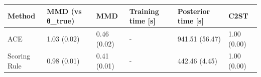 \begin{tabular}{llllll}
\toprule
Method & MMD (vs θ_true) & MMD & Training time [s] & Posterior time [s] & C2ST \\
\midrule
ACE & 1.03 (0.02) & 0.46 (0.02) & - & 941.51 (56.47) & 1.00 (0.00) \\
Scoring Rule & 0.98 (0.01) & 0.41 (0.01) & - & 442.46 (4.45) & 1.00 (0.00) \\
\bottomrule
\end{tabular}
